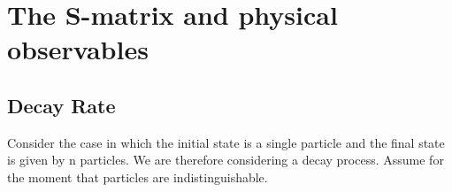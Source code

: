 \chapter{The S-matrix and physical observables}

\section{Decay Rate}
Consider the case in which the initial state is a single particle and the final state is given by n particles. We are therefore considering a decay process. Assume for the moment that particles are indistinguishable.

\begin{center}
\begin{tikzpicture}[x=0.75pt,y=0.75pt,yscale=-1,xscale=1]


\end{tikzpicture}
\end{center}
